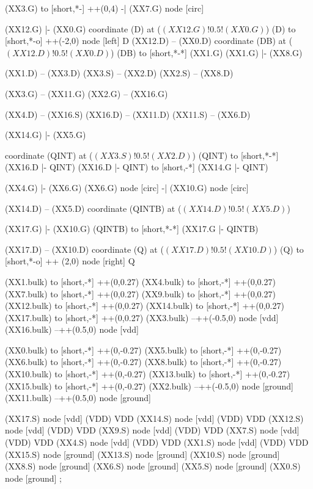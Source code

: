 \begin{circuitikz}[american]
	(XX3.G) to [short,*-] ++(0,4) -| (XX7.G) node [circ] {}
	
	(XX12.G) |- (XX0.G)
	coordinate (D) at ($(XX12.G)!0.5!(XX0.G)$)
	(D) to [short,*-o] ++(-2,0) node [left] {D}
	(XX12.D) -- (XX0.D) 
	coordinate (DB) at ($(XX12.D)!0.5!(XX0.D)$)
	(DB) to [short,*-*] (XX1.G)
	(XX1.G) |- (XX8.G)
	
	(XX1.D) -- (XX3.D) 
	(XX3.S) -- (XX2.D)
	(XX2.S) -- (XX8.D)
	
	(XX3.G) -- (XX11.G)
	(XX2.G) -- (XX16.G)
	
	(XX4.D) -- (XX16.S)
	(XX16.D) -- (XX11.D)
	(XX11.S) -- (XX6.D)
	
	(XX14.G) |- (XX5.G)	

	coordinate (QINT) at ($(XX3.S)!0.5!(XX2.D)$)
	(QINT) to [short,*-*] (XX16.D |- QINT)
	(XX16.D |- QINT) to [short,-*] (XX14.G |- QINT)	
	
	(XX4.G) |- (XX6.G)
	(XX6.G) node [circ] {} -| (XX10.G) node [circ] {}
	
	(XX14.D) -- (XX5.D)
	coordinate (QINTB) at ($(XX14.D)!0.5!(XX5.D)$)
	
	(XX17.G) |- (XX10.G)
	(QINTB) to [short,*-*] (XX17.G |- QINTB) 
	
	(XX17.D) -- (XX10.D)
	coordinate (Q) at ($(XX17.D)!0.5!(XX10.D)$)
	(Q) to [short,*-o] ++ (2,0) node [right] {Q}
	
	(XX1.bulk) to [short,-*] ++(0,0.27)
	(XX4.bulk) to [short,-*] ++(0,0.27)
	(XX7.bulk) to [short,-*] ++(0,0.27)
	(XX9.bulk) to [short,-*] ++(0,0.27)
	(XX12.bulk) to [short,-*] ++(0,0.27)
	(XX14.bulk) to [short,-*] ++(0,0.27)
	(XX17.bulk) to [short,-*] ++(0,0.27)
	(XX3.bulk) --++(-0.5,0) node [vdd] {}
	(XX16.bulk) --++(0.5,0) node [vdd] {}
	
	(XX0.bulk) to [short,-*] ++(0,-0.27)
	(XX5.bulk) to [short,-*] ++(0,-0.27)
	(XX6.bulk) to [short,-*] ++(0,-0.27)
	(XX8.bulk) to [short,-*] ++(0,-0.27)
	(XX10.bulk) to [short,-*] ++(0,-0.27)
	(XX13.bulk) to [short,-*] ++(0,-0.27)
	(XX15.bulk) to [short,-*] ++(0,-0.27)
	(XX2.bulk) --++(-0.5,0) node [ground] {}
	(XX11.bulk) --++(0.5,0) node [ground] {}
	

	(XX17.S) node [vdd] (VDD) {VDD}
	(XX14.S) node [vdd] (VDD) {VDD}
	(XX12.S) node [vdd] (VDD) {VDD}
	(XX9.S) node [vdd] (VDD) {VDD}
	(XX7.S) node [vdd] (VDD) {VDD}
	(XX4.S) node [vdd] (VDD) {VDD}
	(XX1.S) node [vdd] (VDD) {VDD}
	(XX15.S) node [ground] {}
	(XX13.S) node [ground] {}
	(XX10.S) node [ground] {}
	(XX8.S) node [ground] {}
	(XX6.S) node [ground] {}
	(XX5.S) node [ground] {}
	(XX0.S) node [ground] {}
;

\end{circuitikz}
